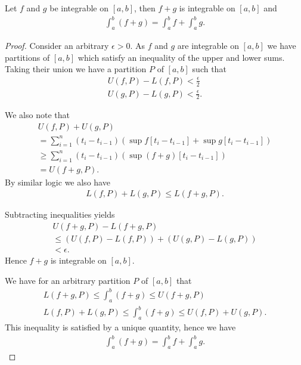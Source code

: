 \documentclass[]{article}
\begin{document}
\begin{thm}
		Let $f$ and $g$ be integrable on $[a,b]$, then $f+g$ is integrable on $[a,b]$ and 
		\begin{align*}
				\int_a^b(f+g) = \int_a^bf + \int_a^bg.
		\end{align*}
\end{thm}

\begin{proof}
		Consider an arbitrary $\epsilon > 0$. As $f$ and $g$ are integrable on $[a,b]$ we have partitions of $[a,b]$ which satisfy an inequality of the upper and lower sums. Taking their union we have a partition  $P$ of $[a,b]$ such that
		\begin{align*}
				U(f,P) - L(f,P) < \frac{\epsilon}{2} \\
				U(g,P) - L(g,P) < \frac{\epsilon}{2}.
		\end{align*}

		We also note that
		\begin{align*}
				U(f,P) + U(g,P) \\
				= \sum_{i=1}^n (t_i - t_{i-1}) (\sup f[t_i - t_{i-1}] + \sup g[t_i - t_{i-1}]) \\
				\geq \sum_{i=1}^n (t_i - t_{i-1}) (\sup (f+g)[t_i - t_{i-1}]) \\
				= U(f+g,P).
		\end{align*}
		By similar logic we also have
		\begin{align*}
				L(f,P) + L(g,P) \leq L(f+g,P).
		\end{align*}

		Subtracting inequalities yields
		\begin{align*}
				U(f+g,P) - L(f+g,P) \\
				\leq (U(f,P) - L(f,P)) + (U(g,P) - L(g,P)) \\
				< \epsilon.
		\end{align*}
		Hence $f+g$ is integrable on $[a,b]$.

		We have for an arbitrary partition $P$ of $[a,b]$ that
		\begin{align*}
				L(f+g,P) \leq \int_a^b(f+g) \leq U(f+g,P) \\
				L(f,P)+ L(g,P) \leq \int_a^b(f+g) \leq U(f,P)+U(g,P).
		\end{align*}
		This inequality is satisfied by a unique quantity, hence we have
		\begin{align*}
				\int_a^b (f+g) = \int_a^bf + \int_a^bg.
		\end{align*}
\end{proof}
\end{document}
